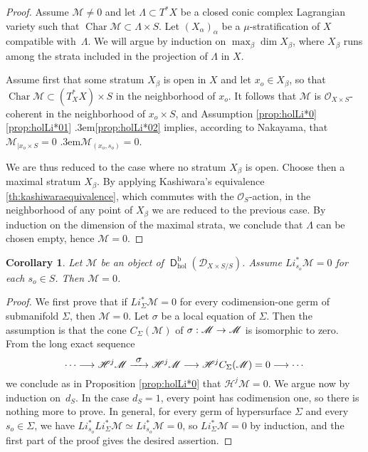 \documentclass[english]{smfart}
\numberwithin{subsection}{section}
\def\shd{\mathcal{D}}\let\cD\shd
\def\shh{\mathcal{H}}
\def\shh{\mathcal{H}}
\def\shm{\mathcal{M}}
\def\sho{\mathcal{O}}\let\cO\sho
\newcommand{\rb}{\mathrm{b}}
\newcommand{\hol}{\mathrm{hol}}
\newcommand{\XS}{X\times S}
\newcommand{\DXS}{\shd_{\XS/S}}
\DeclareMathOperator{\Char}{Char}
\DeclareMathOperator{\rD}{\mathsf{D}}
\def\resp{\text{resp.}\kern.3em}
\numberwithin{equation}{section}
\theoremstyle{plain}
\newtheorem{corollary}[equation]{Corollary}
\theoremstyle{definition}
\def\to{\mathchoice{\longrightarrow}{\rightarrow}{\rightarrow}{\rightarrow}}
\def\To#1{\mathchoice{\xrightarrow{\textstyle\kern4pt#1\kern3pt}}{\stackrel{#1}{\longrightarrow}}{}{}}
\begin{document}
\begin{proof}
Assume $\shm\neq0$ and let $\Lambda\subset T^*X$ be a closed conic complex Lagrangian variety such that $\Char\shm\subset\Lambda\times S$. Let $(X_\alpha)_\alpha$ be a $\mu$-stratification of $X$ compatible with~$\Lambda$. We will argue by induction on $\max_\beta\dim X_\beta$, where $X_\beta$ runs among the strata included in the projection of $\Lambda$ in $X$.

Assume first that some stratum $X_\beta$ is open in $X$ and let $x_o\in X_\beta$, so that $\Char\shm\subset(T^*_XX)\times S$ in the neighborhood of $x_o$. It follows that $\shm$ is $\cO_{\XS}$-coherent in the neighborhood of $x_o\times S$, and Assumption \ref{prop:holLi*0}\eqref{prop:holLi*01} \resp \eqref{prop:holLi*02} implies, according to Nakayama, that $\shm_{|x_o\times S}=0$ \resp $\shm_{(x_o,s_o)}=0$.

We are thus reduced to the case where no stratum $X_\beta$ is open. Choose then a maximal stratum $X_\beta$. By applying Kashiwara's equivalence \ref{th:kashiwaraequivalence}, which commutes with the $\sho_S$-action, in the neighborhood of any point of $X_\beta$ we are reduced to the previous case. By induction on the dimension of the maximal strata, we conclude that $\Lambda$ can be chosen empty, hence $\shm=0$.
\end{proof}

\begin{corollary}
Let $\shm$ be an object of $\rD^\rb_\hol(\DXS)$. Assume $L i^*_{s_o}\shm=0$ for each $s_o\in S$. Then $\shm=0$.
\end{corollary}

\begin{proof}
We first prove that if $L i^*_\Sigma\shm=0$ for every codimension-one germ of submanifold $\Sigma$, then $\shm=0$. Let $\sigma$ be a local equation of $\Sigma$. Then the assumption is that the cone $C_\Sigma(\shm)$ of $\sigma:\shm\to\shm$ is isomorphic to zero. From the long exact sequence
\[
\cdots\to\shh^j\shm\To{\sigma}\shh^j\shm\to\shh^jC_\Sigma(\shm)=0\to\cdots
\]
we conclude as in Proposition \ref{prop:holLi*0} that $\shh^j\shm=0$. We argue now by induction on~$d_S$. In the case $d_S=1$, every point has codimension one, so there is nothing more to prove. In general, for every germ of hypersurface $\Sigma$ and every $s_o\in \Sigma$, we have $Li^*_{s_o}Li_\Sigma^*\shm\simeq Li^*_{s_o}\shm=0$, so $Li_\Sigma^*\shm=0$ by induction, and the first part of the proof gives the desired assertion.
\end{proof}
\end{document}
